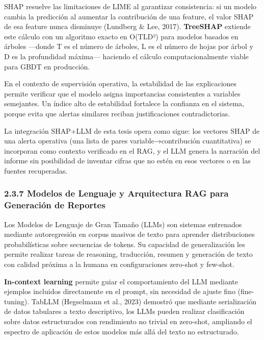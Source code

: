SHAP resuelve las limitaciones de LIME al garantizar consistencia: si un
modelo cambia la predicción al aumentar la contribución de una feature,
el valor SHAP de esa feature nunca disminuye (Lundberg \& Lee, 2017).
\textbf{TreeSHAP} extiende este cálculo con un algoritmo exacto en
O(TLD²) para modelos basados en árboles ---donde T es el número de
árboles, L es el número de hojas por árbol y D es la profundidad
máxima--- haciendo el cálculo computacionalmente viable para GBDT en
producción.

En el contexto de supervisión operativa, la estabilidad de las
explicaciones permite verificar que el modelo asigna importancias
consistentes a variables semejantes. Un índice alto de estabilidad
fortalece la confianza en el sistema, porque evita que alertas similares
reciban justificaciones contradictorias.

La integración SHAP+LLM de esta tesis opera como sigue: los vectores
SHAP de una alerta operativa (una lista de pares variable→contribución
cuantitativa) se incorporan como contexto verificado en el RAG, y el LLM
genera la narración del informe sin posibilidad de inventar cifras que
no estén en esos vectores o en las fuentes recuperadas.

\subsubsection{2.3.7 Modelos de Lenguaje y Arquitectura RAG para
Generación de
Reportes}\label{modelos-de-lenguaje-y-arquitectura-rag-para-generaciuxf3n-de-reportes}

Los Modelos de Lenguaje de Gran Tamaño (LLMs) son sistemas entrenados
mediante autoregresión en corpus masivos de texto para aprender
distribuciones probabilísticas sobre secuencias de tokens. Su capacidad
de generalización les permite realizar tareas de reasoning, traducción,
resumen y generación de texto con calidad próxima a la humana en
configuraciones zero-shot y few-shot.

\textbf{In-context learning} permite guiar el comportamiento del LLM
mediante ejemplos incluidos directamente en el prompt, sin necesidad de
ajuste fino (fine-tuning). TabLLM (Hegselmann et al., 2023) demostró que
mediante serialización de datos tabulares a texto descriptivo, los LLMs
pueden realizar clasificación sobre datos estructurados con rendimiento
no trivial en zero-shot, ampliando el espectro de aplicación de estos
modelos más allá del texto no estructurado.

